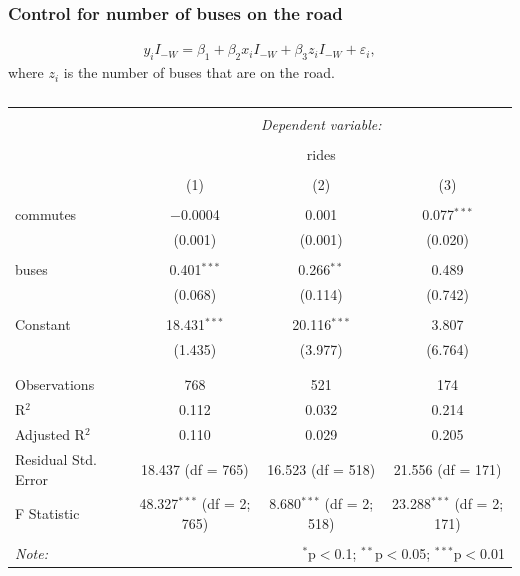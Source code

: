 \documentclass{article}
\begin{document}
\subsubsection{Control for number of buses on the road}
\begin{align}
    y_i I_{-W} = \beta_1 + \beta_2 x_i I_{-W} + \beta_3 z_i I_{-W} + \varepsilon_i,
\end{align}
where $z_i$ is the number of buses that are on the road.

\begin{table}[!htbp] \centering 
  \caption{} 
  \label{} 
\begin{tabular}{@{\extracolsep{5pt}}lccc} 
\\[-1.8ex]\hline 
\hline \\[-1.8ex] 
 & \multicolumn{3}{c}{\textit{Dependent variable:}} \\ 
\cline{2-4} 
\\[-1.8ex] & \multicolumn{3}{c}{rides} \\ 
\\[-1.8ex] & (1) & (2) & (3)\\ 
\hline \\[-1.8ex] 
 commutes & $-$0.0004 & 0.001 & 0.077$^{***}$ \\ 
  & (0.001) & (0.001) & (0.020) \\ 
  & & & \\ 
 buses & 0.401$^{***}$ & 0.266$^{**}$ & 0.489 \\ 
  & (0.068) & (0.114) & (0.742) \\ 
  & & & \\ 
 Constant & 18.431$^{***}$ & 20.116$^{***}$ & 3.807 \\ 
  & (1.435) & (3.977) & (6.764) \\ 
  & & & \\ 
\hline \\[-1.8ex] 
Observations & 768 & 521 & 174 \\ 
R$^{2}$ & 0.112 & 0.032 & 0.214 \\ 
Adjusted R$^{2}$ & 0.110 & 0.029 & 0.205 \\ 
Residual Std. Error & 18.437 (df = 765) & 16.523 (df = 518) & 21.556 (df = 171) \\ 
F Statistic & 48.327$^{***}$ (df = 2; 765) & 8.680$^{***}$ (df = 2; 518) & 23.288$^{***}$ (df = 2; 171) \\ 
\hline 
\hline \\[-1.8ex] 
\textit{Note:}  & \multicolumn{3}{r}{$^{*}$p$<$0.1; $^{**}$p$<$0.05; $^{***}$p$<$0.01} \\ 
\end{tabular} 
\end{table} 
\end{document}
